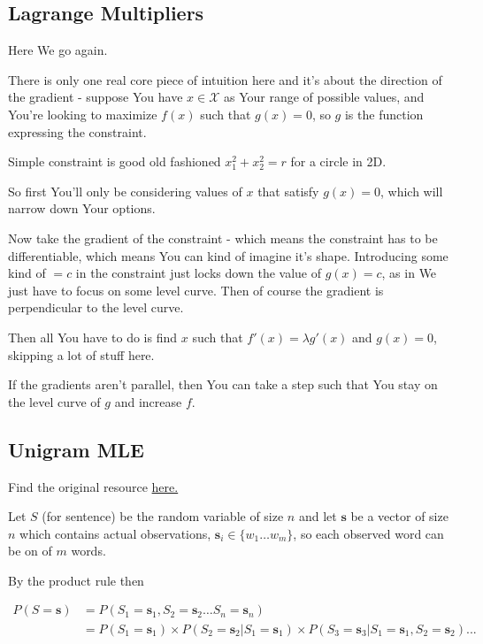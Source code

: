 \documentclass{article}
\begin{document}
			
	\subsection{Lagrange Multipliers}
	
		Here We go again.
		
		There is only one real core piece of intuition here and it's about the direction of the gradient - suppose You have $x\in\mathcal{X}$ as Your range of possible values, and You're looking to maximize $f(x)$ such that $g(x) = 0$, so $g$ is the function expressing the constraint.
		
		Simple constraint is good old fashioned $x_1^2+x_2^2=r$ for a circle in 2D.
		
		So first You'll only be considering values of $x$ that satisfy $g(x)=0$, which will narrow down Your options.
		
		Now take the gradient of the constraint - which means the constraint has to be differentiable, which means You can kind of imagine it's shape. Introducing some kind of $=c$ in the constraint just locks down the value of $g(x)=c$, as in We just have to focus on some level curve. Then of course the gradient is perpendicular to the level curve.
		
		Then all You have to do is find $x$ such that $f'(x) = \lambda g'(x)$ and $g(x)=0$, skipping a lot of stuff here.
		
		If the gradients aren't parallel, then You can take a step such that You stay on the level curve of $g$ and increase $f$.
		
	\subsection{Unigram MLE}
	
		Find the original resource \href{https://leimao.github.io/blog/Maximum-Likelihood-Estimation-Ngram/}{here.}
		
		Let $S$ (for sentence) be the random variable of size $n$ and let $\mathbf{s}$ be a vector of size $n$ which contains actual observations, $\mathbf{s}_i\in\{ w_1\ldots w_m \}$, so each observed word can be on of $m$ words.
		
		By the product rule then
		
		\begin{align}
			P(S=\mathbf{s}) &= P(S_1=\mathbf{s}_1, S_2=\mathbf{s}_2\ldots S_n=\mathbf{s}_n)\\
			&= P(S_1=\mathbf{s}_1)\times P(S_2=\mathbf{s}_2 | S_1=\mathbf{s}_1) \times P(S_3=\mathbf{s}_3 | S_1=\mathbf{s}_1, S_2=\mathbf{s}_2)...
		\end{align}		
			
\end{document}
